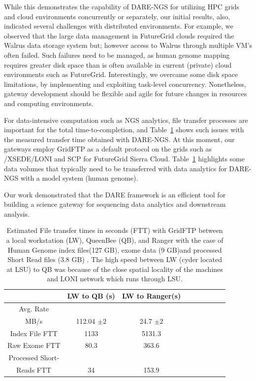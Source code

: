 \documentclass[]{svjour3}
\begin{document}
While this demonstrates the capability of DARE-NGS for utilizing HPC
grids and cloud environments concurrently or separately, our initial
results, also, indicated several challenges with distributed
environments. For example, we observed that the large data management
in FutureGrid clouds required the Walrus data storage system but;
however access to Walrus through multiple VM's often failed. Such
failures need to be managed, as human genome mapping requires greater
disk space than is often available in current (private) cloud
environments such as FutureGrid. Interestingly, we overcame some disk
space limitations, by implementing and exploiting task-level
concurrency. Nonetheless, gateway development should be flexible and
agile for future changes in resources and computing environments.

For data-intensive computation such as NGS analytics, file transfer
processes are important for the total time-to-completion, and
Table~\ref{table:NGS-Distributed-file} shows such issues with the
measured transfer time obtained with DARE-NGS. At this moment, our
gateways employ GridFTP as a default protocol on the grids such as
/XSEDE/LONI and SCP for FutureGrid Sierra Cloud.
Table~\ref{table:NGS-Distributed-file} highlights some data volumes
that typically need to be transferred with data analytics for DARE-NGS
with a model system (human genome).



Our
work demonstrated that the DARE framework is an efficient tool for
building a science gateway for sequencing data analytics and
downstream analysis.

 \begin{table}
\centering
 \small
 \begin{tabular}{|c|c|c|c|c|c|c|c|c|} 
 \hline 
 	     & LW to QB (s) & LW to Ranger(s) \\
 \hline            
Avg. Rate && \\
MB/s & 112.04 $\pm 2$ &	  24.7 $\pm 2$ \\
 \hline            
Index File	FTT & 1133 &	  5131.3   \\    
 \hline            
Raw 	 Exome FTT&80.3 & 363.6\\         
 \hline            
Processed Short-&  & \\
Reads FTT&34&153.9 \\
 \hline            
          
\end{tabular}


\caption{Estimated File transfer times in seconds (FTT) with GridFTP between
a local workstation (LW), QueenBee (QB), and Ranger with the case of
Human Genome index files(127 GB), exome data (9 GB)and processed
Short Read files (3.8 GB) . The high speed between LW (cyder located at LSU)
to QB was because of the close spatial locality of the machines and
LONI network which runs through LSU. }

 \label{table:NGS-Distributed-file} 
\end{table}
\end{document}

